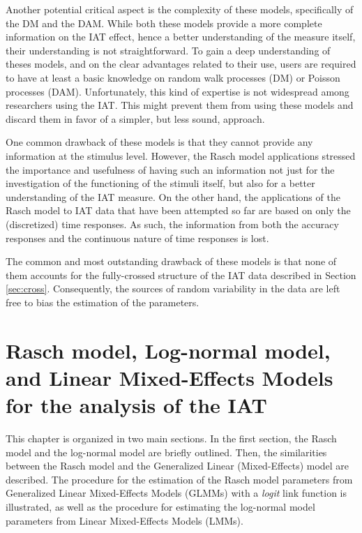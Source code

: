 \documentclass[12pt]{book}
\begin{document}
Another potential critical aspect is the complexity of these models, specifically of the DM and the DAM. 
While both these models provide a more complete information on the IAT effect, hence a better understanding of the measure itself, their understanding is not straightforward. To gain a deep understanding of theses models, and on the clear advantages related to their use, users are required to have at least a basic knowledge on random walk processes (DM) or Poisson processes (DAM). 
Unfortunately, this kind of expertise is not widespread among researchers using the IAT. This might prevent them from using these models and discard them in favor of a simpler, but less sound, approach.

 One common drawback of these models is that they cannot provide any information at the stimulus level. 
However, the Rasch model applications stressed the importance and usefulness of having such an information not just for the investigation of the functioning of the stimuli itself, but also for a better understanding of the IAT measure. 
On the other hand, the applications of the Rasch model to IAT data that have been attempted so far are based on only the (discretized) time responses. As such, the information from both the accuracy responses and the continuous nature of time responses is lost. 

The common and most outstanding drawback of these models is that none of them accounts for the fully-crossed structure of the IAT data described in Section \ref{sec:cross}. 
Consequently, the sources of random variability in the data are left free to bias the estimation of the parameters.

\chapter[Rasch, Log-normal, and Linear Mixed-Effects models]{Rasch model, Log-normal model, and Linear Mixed-Effects Models for the analysis of the IAT}\label{chap:modelsIAT}
This chapter is organized in two main sections. 
In the first section, the Rasch model and the log-normal model are briefly outlined. 
Then, the similarities between the Rasch model and the Generalized Linear (Mixed-Effects) model are described. 
The procedure for the estimation of the Rasch model parameters from Generalized Linear Mixed-Effects Models (GLMMs) with a \emph{logit} link function is illustrated, as well as the procedure for estimating the log-normal model parameters from Linear Mixed-Effects Models (LMMs). 
\end{document}
